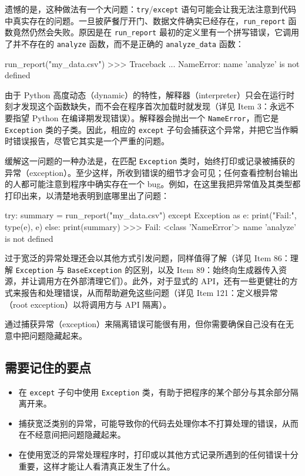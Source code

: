 遗憾的是，这种做法有一个大问题：\texttt{try}/\texttt{except} 语句可能会让我无法注意到代码中真实存在的问题。一旦披萨餐厅开门、数据文件确实已经存在，\texttt{run\_report} 函数竟然仍然会失败。原因是在 \texttt{run\_report} 最初的定义里有一个拼写错误，它调用了并不存在的 \texttt{analyze} 函数，而不是正确的 \texttt{analyze\_data} 函数：

\begin{codebox}[python]
run_report("my_data.csv")
>>>
Traceback ...
NameError: name 'analyze' is not defined
\end{codebox}

由于 Python 高度动态（dynamic）的特性，解释器（interpreter）只会在运行时刻才发现这个函数缺失，而不会在程序首次加载时就发现（详见 Item 3：永远不要指望 Python 在编译期发现错误）。解释器会抛出一个 \texttt{NameError}，而它是 \texttt{Exception} 类的子类。因此，相应的 \texttt{except} 子句会捕获这个异常，并把它当作瞬时错误报告，尽管它其实是一个严重的问题。

缓解这一问题的一种办法是，在匹配 \texttt{Exception} 类时，始终打印或记录被捕获的异常（exception）。至少这样，所收到错误的细节才会可见；任何查看控制台输出的人都可能注意到程序中确实存在一个 bug。例如，在这里我把异常值及其类型都打印出来，以清楚地表明到底哪里出了问题：

\begin{codebox}[python]
try:
    summary = run_report("my_data.csv")
except Exception as e:
    print("Fail:", type(e), e)
else:
    print(summary)
>>>
Fail: <class 'NameError'> name 'analyze' is not defined
\end{codebox}

过于宽泛的异常处理还会以其他方式引发问题，同样值得了解（详见 Item 86：理解 \texttt{Exception} 与 \texttt{BaseException} 的区别，以及 Item 89：始终向生成器传入资源，并让调用方在外部清理它们）。此外，对于显式的 API，还有一些更健壮的方式来报告和处理错误，从而帮助避免这些问题（详见 Item 121：定义根异常（root exception）以将调用方与 API 隔离）。

通过捕获异常（exception）来隔离错误可能很有用，但你需要确保自己没有在无意中把问题隐藏起来。

\subsection{需要记住的要点}

\begin{itemize}
\item 在 \texttt{except} 子句中使用 \texttt{Exception} 类，有助于把程序的某个部分与其余部分隔离开来。
\item 捕获宽泛类别的异常，可能导致你的代码去处理你本不打算处理的错误，从而在不经意间把问题隐藏起来。
\item 在使用宽泛的异常处理程序时，打印或以其他方式记录所遇到的任何错误十分重要，这样才能让人看清真正发生了什么。
\end{itemize}

